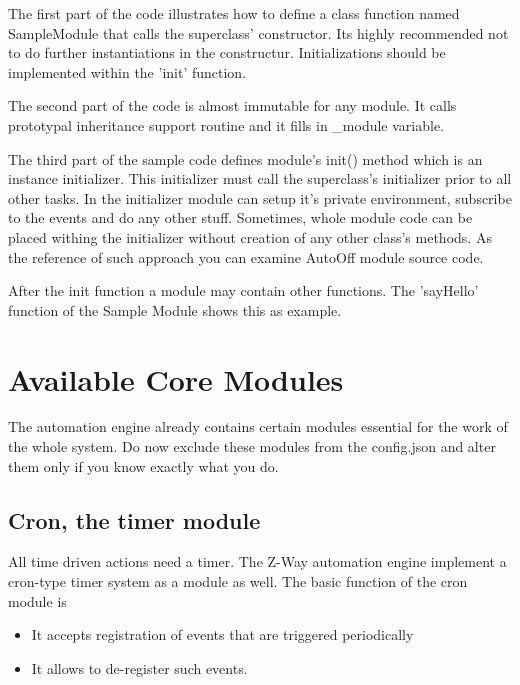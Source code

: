 The first part of the code illustrates how to define a class function named SampleModule that calls the superclass' constructor. Its highly recommended not to do further instantiations in the constructur. Initializations should be implemented within the 'init' function.
 
The second part of the code is almost immutable for any module. It calls prototypal inheritance support routine and it fills in \_module variable.

The third part of the sample code defines module's init() method which is an 
instance initializer. This initializer must call the superclass's initializer prior to all other tasks. In the initializer module can setup it's private environment, subscribe to the events and do any other stuff.
Sometimes, whole module code can be placed withing the initializer without creation of any other class's methods. As the reference of such approach you can examine AutoOff module source code.

After the init function a module may contain other functions. The 'sayHello' function of the Sample Module shows this as example.

\section{Available Core Modules}


The automation engine already contains certain modules essential for the work of the whole system. Do now exclude these modules from the config.json and alter them only if you know exactly what you do.


\subsection{Cron, the timer module}

All time driven actions need a timer. The Z-Way automation engine implement a cron-type timer 
system as a module as well. The basic function of the cron module is

\begin{itemize}
\item It accepts registration of events that are triggered periodically
\item It allows to de-register such events. 
\end{itemize}


